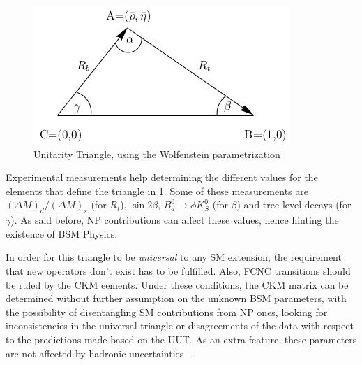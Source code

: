 \begin{figure} [htb!]
\begin{center}
\includegraphics[scale=0.7]{figs/uut.png}
\caption{Unitarity Triangle, using the Wolfenstein parametrization \label{fig:uut}}
\end{center}
\end{figure}

Experimental measurements help determining the different values for the elements that define the triangle in \ref{fig:uut}. Some of these measurements are $(\Delta M)_d/(\Delta M)_s$ (for $R_t$), $\sin{2\beta}$, $B_d^0\rightarrow \phi K_S^0$ (for $\beta$) and tree-level decays (for $\gamma$).%
As said before, NP contributions can affect these values, hence hinting the existence of BSM Physics. 

In order for this triangle to be \textit{universal} to any SM extension, the requirement that new operators don't exist has to be fulfilled. Also, FCNC transitions should be ruled by the CKM eements. 
Under these conditions, the CKM matrix can be determined without further assumption on the unknown BSM parameters, with the possibility of disentangling SM contributions from NP ones, looking for inconsistencies in the universal triangle or disagreements of the data with respect to the predictions made based on the UUT. As an extra feature, these parameters are not affected by hadronic uncertainties ~\cite{Buras:2000dm}. 

